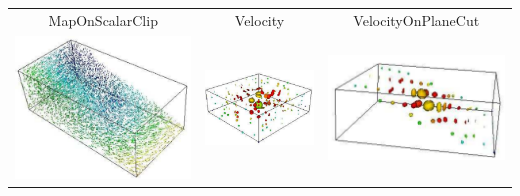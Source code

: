 \begin{table}[h]
\begin{tabular}{c c c}
MapOnScalarClip & Velocity & VelocityOnPlaneCut \\
\includegraphics[width=\thumbnailwidth]{figures/VelocityOnPlaneClip} & 
\includegraphics[width=\thumbnailwidth]{figures/Ellipsoid} & 
\includegraphics[width=\thumbnailwidth]{figures/EllipsoidOnPlaneCut}  \\

\end{tabular}
\end{table}
